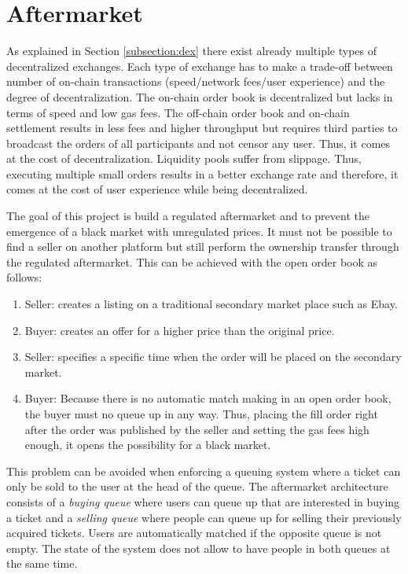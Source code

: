 \section{Aftermarket}\label{section:aftermarket}
As explained in Section \ref{subsection:dex} there exist already multiple types of decentralized exchanges. Each type of exchange has to make a trade-off between number of on-chain transactions (speed/network fees/user experience) and the degree of decentralization. The on-chain order book is decentralized but lacks in terms of speed and low gas fees. The off-chain order book and on-chain settlement results in less fees and higher throughput but requires third parties to broadcast the orders of all participants and not censor any user. Thus, it comes at the cost of decentralization. Liquidity pools suffer from slippage. Thus, executing multiple small orders results in a better exchange rate and therefore, it comes at the cost of user experience while being decentralized.

The goal of this project is build a regulated aftermarket and to prevent the emergence of a black market with unregulated prices. It must not be possible to find a seller on another platform but still perform the ownership transfer through the regulated aftermarket. This can be achieved with the open order book as follows:

\begin{enumerate}
    \item Seller: creates a listing on a traditional secondary market place such as Ebay.
    \item Buyer: creates an offer for a higher price than the original price.
    \item Seller: specifies a specific time when the order will be placed on the secondary market.
    \item Buyer: Because there is no automatic match making in an open order book, the buyer must no queue up in any way. Thus, placing the fill order right after the order was published by the seller and setting the gas fees high enough, it opens the possibility for a black market. 
\end{enumerate}

This problem can be avoided when enforcing a queuing system where a ticket can only be sold to the user at the head of the queue. The aftermarket architecture consists of a \textit{buying queue} where users can queue up that are interested in buying a ticket and a \textit{selling queue} where people can queue up for selling their previously acquired tickets. Users are automatically matched if the opposite queue is not empty. The state of the system does not allow to have people in both queues at the same time. 

